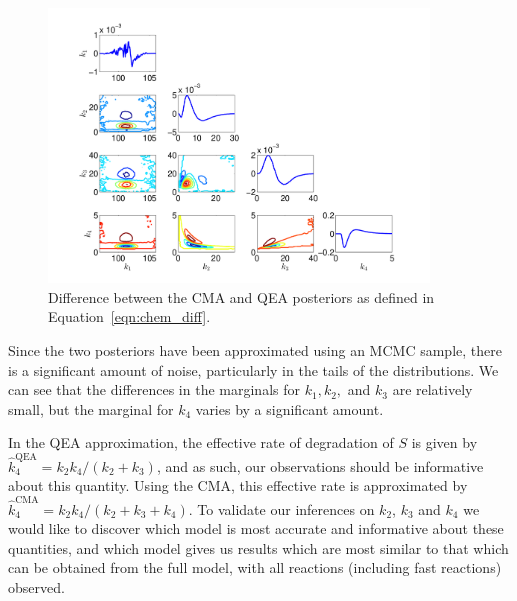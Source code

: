 \documentclass[final]{siamltex}
\begin{document}
\begin{figure}[htb]
\centering
\includegraphics[width=0.9\textwidth]{"images/Applications/Diff_CMA_QEA"}
\caption{Difference between the CMA and QEA posteriors as defined in Equation~\eqref{eqn:chem_diff}.}
\label{fig:chem_diff}
\end{figure}

Since the two posteriors have been approximated using an MCMC sample,
there is a significant amount of noise, particularly in the tails of
the distributions. We can see that the differences in the marginals
for $k_1, k_2,$ and $k_3$ are relatively small, but the marginal for
$k_4$ varies by a significant amount. 

In the QEA approximation, the effective rate of degradation of $S$ is
given by $\hat{k}_4^{\text{QEA}} = k_2k_4/(k_2+k_3)$, and as such, our
observations should be informative about this quantity. Using the CMA,
this effective rate is approximated by $\hat{k}_4^{\text{CMA}} =
k_2k_4/(k_2+k_3+k_4)$. To validate our inferences on $k_2$, $k_3$ and
$k_4$ we would like to discover which model is most accurate and
informative about these quantities, and which model gives us results
which are most similar to that which can be obtained from the full
model, with all reactions (including fast reactions) observed.
\end{document}
